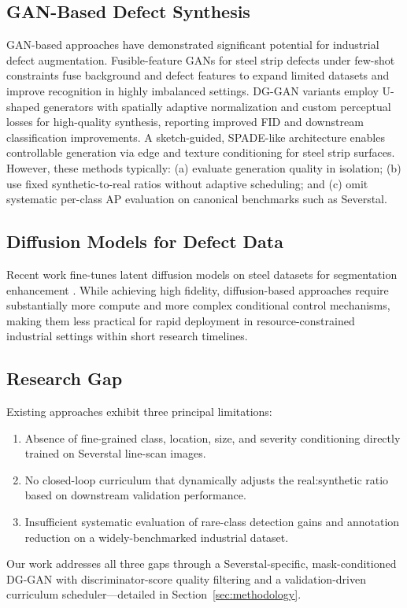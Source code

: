 \documentclass[conference]{IEEEtran}
\begin{document}
\subsection{GAN-Based Defect Synthesis}

GAN-based approaches have demonstrated significant potential for
industrial defect augmentation. Fusible-feature GANs for steel strip
defects under few-shot constraints \cite{fusible_gan} fuse background
and defect features to expand limited datasets and improve recognition
in highly imbalanced settings. DG-GAN variants \cite{dg_gan_surface}
employ U-shaped generators with spatially adaptive normalization and
custom perceptual losses for high-quality synthesis, reporting improved
FID and downstream classification improvements. A sketch-guided,
SPADE-like architecture \cite{sketch_spade_steel} enables controllable
generation via edge and texture conditioning for steel strip surfaces.
However, these methods typically: (a) evaluate generation quality in
isolation; (b) use fixed synthetic-to-real ratios without adaptive
scheduling; and (c) omit systematic per-class AP evaluation on canonical
benchmarks such as Severstal.

\subsection{Diffusion Models for Defect Data}

Recent work fine-tunes latent diffusion models on steel datasets for
segmentation enhancement \cite{diffusion_steel_seg}. While achieving
high fidelity, diffusion-based approaches require substantially more
compute and more complex conditional control mechanisms, making them
less practical for rapid deployment in resource-constrained industrial
settings within short research timelines.

\subsection{Research Gap}

Existing approaches exhibit three principal limitations:
\begin{enumerate}
    \item Absence of fine-grained class, location, size, and severity
          conditioning directly trained on Severstal line-scan images.
    \item No closed-loop curriculum that dynamically adjusts the
          real:synthetic ratio based on downstream validation
          performance.
    \item Insufficient systematic evaluation of rare-class detection
          gains and annotation reduction on a widely-benchmarked
          industrial dataset.
\end{enumerate}
Our work addresses all three gaps through a Severstal-specific,
mask-conditioned DG-GAN with discriminator-score quality filtering and
a validation-driven curriculum scheduler---detailed in
Section~\ref{sec:methodology}.
\end{document}
